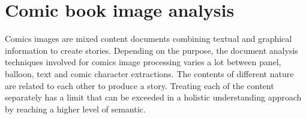 


  




\section{Comic book image analysis} %
\label{sec:comic_book_image}


Comics images are mixed content documents combining textual and graphical information to create stories.
Depending on the purpose, the document analysis techniques involved for comics image processing varies a lot between panel, balloon, text and comic character extractions.
The contents of different nature are related to each other to produce a story.
Treating each of the content separately has a limit that can be exceeded in a holistic understanding approach by reaching a higher level of semantic.



